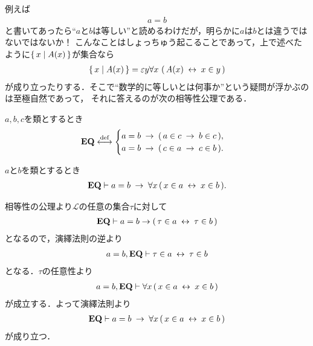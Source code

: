 	例えば
	\begin{align}
		a = b
	\end{align}
	と書いてあったら``$a$と$b$は等しい''と読めるわけだが，明らかに$a$は$b$とは違うではないではないか！
	こんなことはしょっちゅう起こることであって，上で述べたように$\left\{\, x \mid A(x)\, \right\}$が集合なら
	\begin{align}
		\left\{\, x \mid A(x)\, \right\} = \varepsilon y \forall x\, \left(\, A(x) \hspace{0.25em}\leftrightarrow\hspace{0.25em} x \in y\, \right)
	\end{align}
	が成り立ったりする．そこで``数学的に等しいとは何事か''という疑問が浮かぶのは至極自然であって，
	それに答えるのが次の相等性公理である．
	
	\begin{screen}
		\begin{axm}[相等性公理]
			$a,b,c$を類とするとき
			\begin{align}
				\mbox{{\bf EQ}} \overset{\mathrm{def}}{\longleftrightarrow}
				\begin{cases}
					a = b \hspace{0.25em}\rightarrow\hspace{0.25em} (\, a \in c \hspace{0.25em}\rightarrow\hspace{0.25em} b \in c\, ), & \\
					a = b \hspace{0.25em}\rightarrow\hspace{0.25em} (\, c \in a \hspace{0.25em}\rightarrow\hspace{0.25em} c \in b\, ). &
				\end{cases}
			\end{align}
		\end{axm}
	\end{screen}
	
	\begin{screen}
		\begin{thm}[外延性の公理の逆も成り立つ]
		\label{thm:axiom_of_extensionality_equivalent}
			$a$と$b$を類とするとき
			\begin{align}
				\mbox{{\bf EQ}} \vdash 
				a=b \hspace{0.25em}\rightarrow\hspace{0.25em} \forall x\, (\, x \in a  \hspace{0.25em}\leftrightarrow\hspace{0.25em} x \in b\, ).
			\end{align}
		\end{thm}
	\end{screen}
	
	\begin{prf}
		相等性の公理より$\mathcal{L}$の任意の集合$\tau$に対して
		\begin{align}
			\mbox{{\bf EQ}} \vdash a = b \rightarrow (\, \tau \in a \hspace{0.25em}\leftrightarrow\hspace{0.25em} \tau \in b\, )
		\end{align}
		となるので，演繹法則の逆より
		\begin{align}
			a = b, \mbox{{\bf EQ}} \vdash \tau \in a \hspace{0.25em}\leftrightarrow\hspace{0.25em} \tau \in b
		\end{align}
		となる．$\tau$の任意性より
		\begin{align}
			a = b, \mbox{{\bf EQ}} \vdash \forall x\, (\, x \in a  \hspace{0.25em}\leftrightarrow\hspace{0.25em} x \in b\, )
		\end{align}
		が成立する．よって演繹法則より
		\begin{align}
			\mbox{{\bf EQ}} \vdash a = b \hspace{0.25em}\rightarrow\hspace{0.25em} \forall x\, (\, x \in a  \hspace{0.25em}\leftrightarrow\hspace{0.25em} x \in b\, )
		\end{align}
		が成り立つ．
		\QED
	\end{prf}
	
